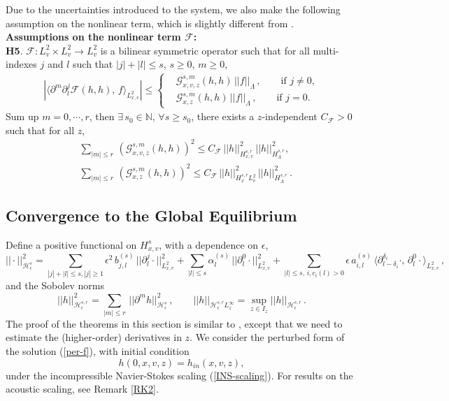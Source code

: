 \documentclass[final,onefignum,onetabnum]{siamart171218}
\begin{document}
Due to the uncertainties introduced to the system, we also make the following assumption on the nonlinear term,
which is slightly different from \cite{MB}.  \\[1pt]

{\bf Assumptions on the nonlinear term $\mathcal F$: }\\
{\bf H5}. $\mathcal F: L^2_v \times L^2_v \to L^2_v$ is a bilinear symmetric operator such that for
all multi-indexes $j$ and $l$ such that $|j|+|l|\leq s$, $s\geq 0$, $m\geq 0$,
\begin{align*}
\left| \langle\partial^{m}\partial_l^j \mathcal F(h,h), \, f\rangle_{L^2_{x,v}}\right| \leq
\begin{cases}
&\displaystyle\mathcal G_{x,v,z}^{s,m}(h,h)\, ||f||_{\Lambda}\,, \qquad \text{if   }  j \neq 0, \\[2pt]
&\displaystyle \mathcal G_{x,z}^{s,m}(h,h)\, ||f||_{\Lambda}\,,  \qquad\text{if   } j=0.
\end{cases}
\end{align*}
Sum up $m=0, \cdots, r$,
then $\exists\, s_0\in \mathbb N, \, \forall s\geq s_0$, there exists a $z$-independent $C_{\mathcal F}>0$ such that for all $z$,
\begin{align*}
&\displaystyle\sum_{|m|\leq r}\, (\mathcal G_{x,v,z}^{s,m}(h,h))^2  \leq C_{\mathcal F}\, ||h||_{H^{s,r}_{x,v}}^2\, ||h||_{H_{\Lambda}^{s,r}}^2, \\[4pt]
&\displaystyle\sum_{|m|\leq r}\, (\mathcal G_{x,z}^{s,m}(h,h))^2 \leq C_{\mathcal F}\, ||h||_{H_{x}^{s,r}L^2_{v}}^2\, ||h||_{H_{\Lambda}^{s,r}}^2\,.
\end{align*}

\subsection{Convergence to the Global Equilibrium}
\label{Thms}
Define a positive functional on $H_{x,v}^{s}$, with a dependence on $\epsilon$,
$$||\cdot||_{\mathcal H_{\epsilon}^s}^2 = \sum_{|j|+|l|\leq s, |j|\geq 1} \epsilon^2\, b_{j,l}^{(s)}\, ||\partial_l^{j}\cdot||_{L^2_{x,v}}^2
+ \sum_{|l|\leq s}\alpha_l^{(s)}\, ||\partial_l^{0}\cdot||_{L^2_{x,v}}^2 + \sum_{|l|\leq s,\, i, c_i(l)>0} \epsilon\, a_{i,l}^{(s)}\,
\langle\partial_{l-\delta_i}^{\delta_i}\cdot, \,\partial_l^{0}\cdot\rangle_{L^2_{x,v}}\,, $$
and the Sobolev norms
$$ ||h||_{\mathcal H_{\epsilon}^{s,r}}^2 = \sum_{|m|\leq r}\, ||\partial^m h||_{\mathcal H_{\epsilon}^s}^2\,, \qquad
||h||_{\mathcal H_{\epsilon}^{s,r}L_z^{\infty}} = \sup_{z\in I_z}||h||_{\mathcal H_{\epsilon}^{s,r}}\,.$$
The proof of the theorems in this section is similar to \cite{MB}, except that we need to estimate the (higher-order) derivatives in $z$.
We consider the perturbed form of the solution (\ref{per-f}), with initial
condition
\begin{equation}
h(0,x,v,z)=h_{in}(x,v,z),
\end{equation}
under the incompressible Navier-Stokes scaling (\ref{INS-scaling}). For results on the acoustic scaling, see Remark \ref{RK2}. 
\end{document}
